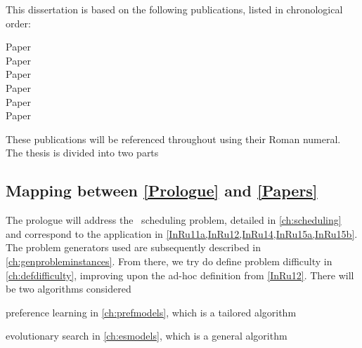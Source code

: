 This dissertation is based on the following publications, listed in 
chronological order:
{\raggedright
\begin{description} 
    \item[Paper ] 
    \item[Paper ] 
    \item[Paper  ] 
    \item[Paper  ] 
    \item[Paper ] 
    \item[Paper ] 
\end{description}}

\noindent These publications will be referenced throughout using their Roman 
numeral. 
The thesis is divided into two parts
\begin{enumerate*}[label={{}}]
    \item \emph{}
    \item \emph{}
\end{enumerate*}
\makeatletter 
{}
\makeatother

\clearpage
\subsection*{Mapping between \cref{Prologue} and \cref{Papers}}
The prologue will address the \jsp\ scheduling problem, detailed in 
\cref{ch:scheduling} and correspond to the application in 
\cref{InRu11a,InRu12,InRu14,InRu15a,InRu15b}. The problem generators 
used are subsequently described in \cref{ch:genprobleminstances}.
From there, we try do define problem difficulty in \cref{ch:defdifficulty}, 
improving upon the ad-hoc definition from \cref{InRu12}. 
There will be two algorithms considered
\begin{enumerate*}
    \item preference learning in \cref{ch:prefmodels}, which is a tailored 
    algorithm
    \item evolutionary search in \cref{ch:esmodels}, which is a general 
    algorithm
\end{enumerate*}

